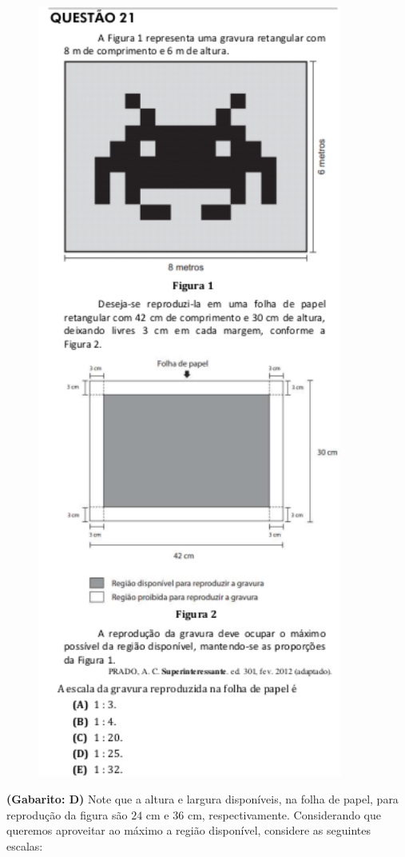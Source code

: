 \documentclass[a4paper]{article}
\begin{document}
\begin{figure}[H]
	\begin{center}
		\includegraphics[width=10cm]{L5Q21.png}
	\end{center}
\end{figure}
\par\textbf{(Gabarito: D)} Note que a altura e largura disponíveis, na folha de papel, para reprodução da figura são $24$ cm e $36$ cm, respectivamente. Considerando que queremos aproveitar ao máximo a região disponível, considere as seguintes escalas:
\end{document}
